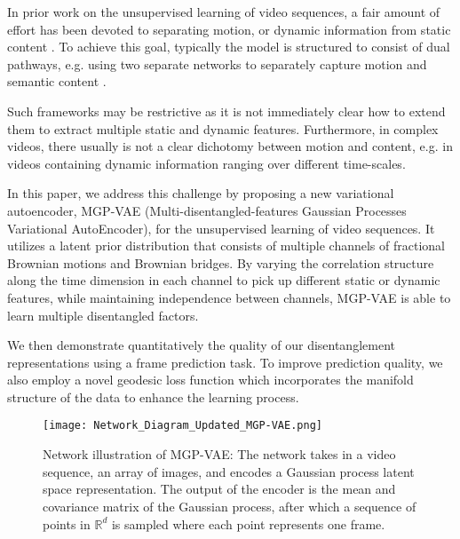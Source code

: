 \documentclass[runningheads]{llncs}
\begin{document}
   In prior work on the unsupervised learning of video sequences, a fair amount of effort has been devoted to separating motion, or dynamic information from static content \cite{Denton2017UnsupervisedLO,Grathwohl2016DisentanglingSA,Hsieh2018LearningTD,Li2018DisentangledSA,Villegas2017DecomposingMA}. To achieve this goal, typically the model is structured to consist of dual pathways, e.g. using two separate networks to separately capture motion and semantic content \cite{Denton2017UnsupervisedLO,Villegas2017DecomposingMA}. \par 

   Such frameworks may be restrictive as it is not immediately clear how to extend them to extract multiple static and dynamic features. Furthermore, in complex videos, there usually is not a clear dichotomy between motion and content, e.g. in videos containing dynamic information ranging over different time-scales. \par 

   In this paper, we address this challenge by proposing a new variational autoencoder, MGP-VAE (Multi-disentangled-features Gaussian Processes Variational AutoEncoder), for the unsupervised learning of video sequences. It utilizes a latent prior distribution that consists of multiple channels of fractional Brownian motions and Brownian bridges. By varying the correlation structure along the time dimension in each channel to pick up different static or dynamic features, while maintaining independence between channels, MGP-VAE is able to learn multiple disentangled factors. \par
   
   We then demonstrate quantitatively the quality of our disentanglement representations using a frame prediction task. To improve prediction quality, we also employ a novel geodesic loss function which incorporates the manifold structure of the data to enhance the learning process. \par 
   
   \begin{figure} 
   \centering  
    \texttt{[image: Network\_Diagram\_Updated\_MGP-VAE.png]}
   \caption{Network illustration of MGP-VAE: The network takes in a video sequence, an array of images, and encodes a Gaussian process latent space representation. The output of the encoder is the mean and covariance matrix of the Gaussian process, after which a sequence of points in $\mathbb{R}^d$ is sampled where each point represents one frame.}
   \end{figure}
\end{document}
